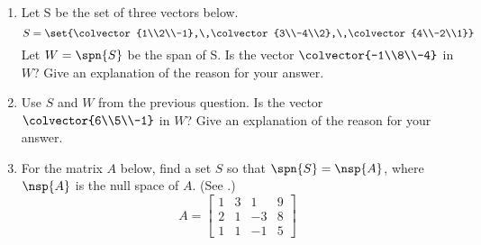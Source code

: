 \begin{enumerate}
%
\item Let  S  be the set of three vectors below. 
%
\begin{equation*}
S=\set{\colvector{1\\2\\-1},\,\colvector{3\\-4\\2},\,\colvector{4\\-2\\1}}
\end{equation*}
%
Let $W=\spn{S}$ be the span of  S. Is the vector $\colvector{-1\\8\\-4}$ in $W$?  Give an explanation of the reason for your answer.
%
\item Use  $S$ and $W$  from the previous question.
Is the vector $\colvector{6\\5\\-1}$ in $W$?  Give an explanation of the reason for your answer.
%
\item For the matrix $A$ below, find a set $S$ so that $\spn{S}=\nsp{A}$, where $\nsp{A}$ is the null space of $A$.  (See .)
%
\begin{equation*}
A=
\begin{bmatrix}
1 & 3 & 1 & 9\\ 
2 & 1 & -3 & 8\\ 
1 & 1 & -1 & 5
\end{bmatrix}
\end{equation*}
%
\end{enumerate}